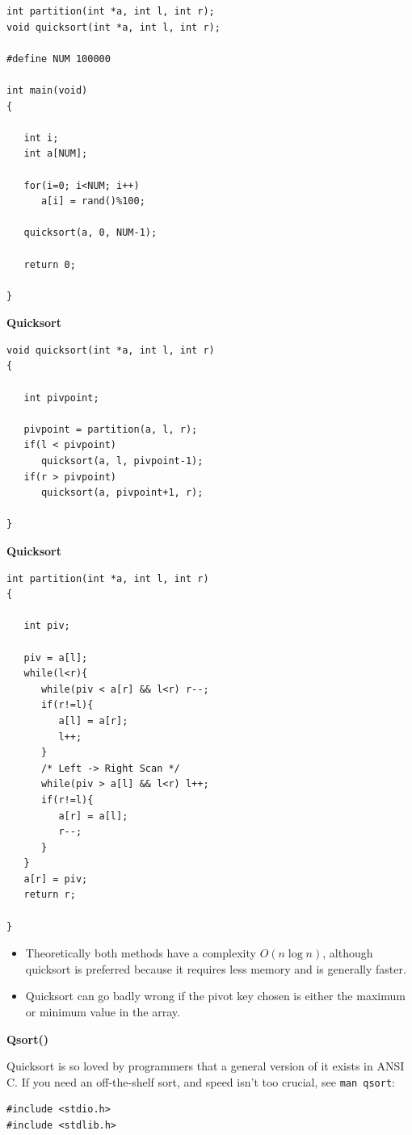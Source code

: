 \documentclass[a4,portraitt]{slides}
\begin{document}
{{{\begin{verbatim}
int partition(int *a, int l, int r);
void quicksort(int *a, int l, int r);

#define NUM 100000

int main(void)
{

   int i;
   int a[NUM];

   for(i=0; i<NUM; i++)
      a[i] = rand()%100;

   quicksort(a, 0, NUM-1);

   return 0;

}
\end{verbatim}
}}

\newpage
{\samepage
\begin{center}
{\Large{\bf Quicksort}}
\end{center}
\begin{verbatim}
void quicksort(int *a, int l, int r)
{

   int pivpoint;

   pivpoint = partition(a, l, r);
   if(l < pivpoint)
      quicksort(a, l, pivpoint-1);
   if(r > pivpoint)
      quicksort(a, pivpoint+1, r);

}

\end{verbatim}
}

\newpage
{\samepage
\begin{center}
{\Large{\bf Quicksort}}
\end{center}
{\small
\begin{verbatim}
int partition(int *a, int l, int r)
{

   int piv;

   piv = a[l];
   while(l<r){
      while(piv < a[r] && l<r) r--;
      if(r!=l){
         a[l] = a[r];
         l++;
      }
      /* Left -> Right Scan */
      while(piv > a[l] && l<r) l++;
      if(r!=l){
         a[r] = a[l];
         r--;
      }
   }
   a[r] = piv;
   return r;

}
\end{verbatim}
\begin{itemize}
\item Theoretically both methods have a complexity $O(n \log n)$,
although quicksort is preferred because it requires less memory and
is generally faster.
\item Quicksort can go badly wrong if the pivot key chosen is either
the maximum or minimum value in the array.
\end{itemize}
}}

\newpage
{\samepage
\begin{center}
{\Large{\bf Qsort()}}
\end{center}
Quicksort is so loved by programmers that a general version of
it exists in ANSI C. If you need an off-the-shelf sort, and speed isn't
too crucial, see \verb^man qsort^:
\begin{verbatim}
#include <stdio.h>
#include <stdlib.h>


\end{verbatim}}}
\end{document}
